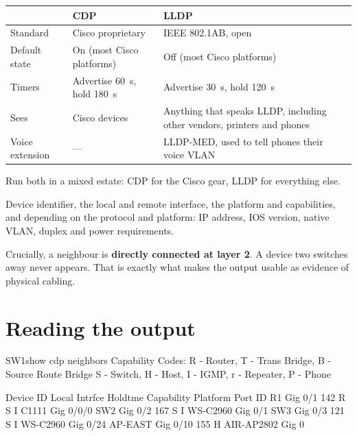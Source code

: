 \begin{longtable}{@{}L{3.0cm}L{5.6cm}L{6.4cm}@{}}
\toprule
{}
\textbf{} & \textbf{CDP} & \textbf{LLDP} \\
\midrule
\endhead
Standard & Cisco proprietary & IEEE 802.1AB, open \\
Default state & On (most Cisco platforms) & Off (most Cisco platforms) \\
Timers & Advertise 60~s, hold 180~s & Advertise 30~s, hold 120~s \\
Sees & Cisco devices & Anything that speaks LLDP, including other vendors,
printers and phones \\
Voice extension & --- & LLDP-MED, used to tell phones their voice VLAN \\
\bottomrule
\end{longtable}

Run both in a mixed estate: CDP for the Cisco gear, LLDP for everything else.

\begin{definitionbox}
Device identifier, the local and remote interface, the platform and capabilities,
and depending on the protocol and platform: IP address, IOS version, native VLAN,
duplex and power requirements.

Crucially, a neighbour is \textbf{directly connected at layer 2}. A device two
switches away never appears. That is exactly what makes the output usable as
evidence of physical cabling.
\end{definitionbox}

\section{Reading the output}

\begin{verify}{SW1}{show cdp neighbors}
Capability Codes: R - Router, T - Trans Bridge, B - Source Route Bridge
                  S - Switch, H - Host, I - IGMP, r - Repeater, P - Phone

Device ID    Local Intrfce   Holdtme   Capability   Platform    Port ID
R1           Gig 0/1          142        R S I      C1111       Gig 0/0/0
SW2          Gig 0/2          167        S I        WS-C2960    Gig 0/1
SW3          Gig 0/3          121        S I        WS-C2960    Gig 0/24
AP-EAST      Gig 0/10         155        H          AIR-AP2802  Gig 0
\end{verify}

